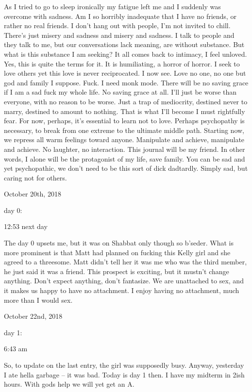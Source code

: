 As I tried to go to sleep ironically my fatigue left me and I suddenly
was overcome with sadness. Am I so horribly inadequate that I have no
friends, or rather no real friends. I don't hang out with people, I'm
not invited to chill. There's just misery and sadness and misery and
sadness. I talk to people and they talk to me, but our conversations
lack meaning, are without substance. But what is this substance I am
seeking? It all comes back to intimacy, I feel unloved. Yes, this is
quite the terms for it. It is humiliating, a horror of horror. I seek to
love others yet this love is never reciprocated. I now see. Love no one,
no one but god and family I suppose. Fuck. I need monk mode. There will
be no saving grace if I am a sad fuck my whole life. No saving grace at
all. I'll just be worse than everyone, with no reason to be worse. Just
a trap of mediocrity, destined never to marry, destined to amount to
nothing. That is what I'll become I must rightfully fear. For now,
perhaps, it's essential to learn not to love. Perhaps psychopathy is
necessary, to break from one extreme to the ultimate middle path.
Starting now, we repress all warm feelings toward anyone. Manipulate and
achieve, manipulate and achieve. No laughter, no interaction. This
journal will be my friend. In other words, I alone will be the
protagonist of my life, save family. You can be sad and yet
psychopathic, we don't need to be this sort of dick dadtardly. Simply
sad, but caring not for others.

\bigskip
\bigskip
October 20th, 2018

day 0:

12:53 next day

The day 0 upsets me, but it was on Shabbat only though so b'seder. What
is more prominent is that Matt had planned on fucking this Kelly girl
and she agreed to a threesome. Matt didn't tell her it was me who was
the third member, he just said it was a friend. This prospect is
exciting, but it mustn't change anything. Don't expect anything, don't
fantasize. We are unattached to sex, and it makes us happy to have no
attachment. I enjoy having no attachment, much more than I would sex.

\bigskip
\bigskip
October 22nd, 2018

day 1:

6:43 am

So, to update on the last entry, the girl was supposedly busy. Anyway,
yesterday I ate hella garbage -- it was bad. Today is day 1 then. I have
my midterm in 2ish hours. With gods help we will yet get an A.

